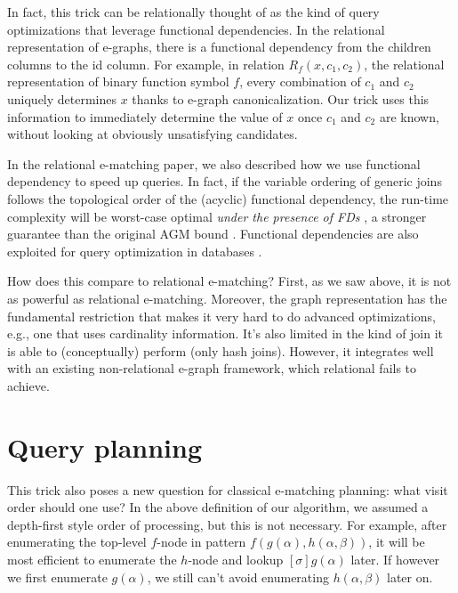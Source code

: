 In fact, this trick can be relationally thought of as the kind of query
 optimizations that leverage functional dependencies.
In the relational representation of e-graphs,
 there is a functional dependency from the
 children columns to the id column.
For example, in relation
 \(R_f(x, c_1, c_2)\), the relational representation of binary function
 symbol \(f\), every combination of \(c_1\) and \(c_2\) uniquely
 determines \(x\) thanks to e-graph canonicalization.
Our trick uses this
 information to immediately determine the value of \(x\) once \(c_1\) and
 \(c_2\) are known, without looking at obviously unsatisfying candidates.

In the relational e-matching paper,
 we also described how we use
 functional dependency to speed up queries.
In fact, if the variable
 ordering of generic joins follows the topological order of the (acyclic)
 functional dependency,
 the run-time complexity will be worst-case
 optimal \textit{under the presence of FDs} \citep{wcoj-survey}, 
 a stronger guarantee than the original
 AGM bound \citep{agm}.
Functional dependencies are also exploited
 for query optimization in databases \citep{data-dep-for-opt-survey}.

How does this compare to relational e-matching? 
First, as we saw above,
 it is not as powerful as relational e-matching.
Moreover, 
 the graph representation has the fundamental restriction 
 that makes it very hard
 to do advanced optimizations, 
 e.g., one that uses cardinality information.
It's also limited in the kind of join it is able to
 (conceptually) perform (only hash joins).
However, 
 it integrates well
 with an existing non-relational e-graph framework,
 which relational \ematching fails to achieve.

\section{Query planning}\label{query-planning}

This trick also poses a new question for classical e-matching planning:
what visit order should one use? In the above definition of our algorithm,
 we assumed a depth-first style order of processing, but this is not
 necessary.
For example,
 after enumerating the top-level \(f\)-node in
 pattern \(f(g(\alpha), h(\alpha, \beta))\), it will be most efficient to
 enumerate the \(h\)-node and lookup \([\sigma]g(\alpha)\) later.
If however we first enumerate \(g(\alpha)\),
we still can't avoid enumerating \(h(\alpha,\beta)\) later on.

